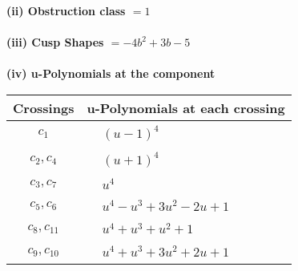 \documentclass[1p]{elsarticle_modified}
\theoremstyle{definition}
\begin{document}
\flushleft \textbf{(ii) Obstruction class $= 1$}\\~\\
\flushleft \textbf{(iii) Cusp Shapes $= -4 b^2+3 b-5$}\\~\\
\newpage\renewcommand{\arraystretch}{1}
\flushleft \textbf{(iv) u-Polynomials at the component}\newline \\
\begin{tabular}{m{50pt}|m{274pt}}
Crossings & \hspace{64pt}u-Polynomials at each crossing \\
\hline $$\begin{aligned}c_{1}\end{aligned}$$&$\begin{aligned}
&(u-1)^4
\end{aligned}$\\
\hline $$\begin{aligned}c_{2},c_{4}\end{aligned}$$&$\begin{aligned}
&(u+1)^4
\end{aligned}$\\
\hline $$\begin{aligned}c_{3},c_{7}\end{aligned}$$&$\begin{aligned}
&u^4
\end{aligned}$\\
\hline $$\begin{aligned}c_{5},c_{6}\end{aligned}$$&$\begin{aligned}
&u^4- u^3+3 u^2-2 u+1
\end{aligned}$\\
\hline $$\begin{aligned}c_{8},c_{11}\end{aligned}$$&$\begin{aligned}
&u^4+u^3+u^2+1
\end{aligned}$\\
\hline $$\begin{aligned}c_{9},c_{10}\end{aligned}$$&$\begin{aligned}
&u^4+u^3+3 u^2+2 u+1
\end{aligned}$\\
\hline
\end{tabular}\\~\\
\end{document}
